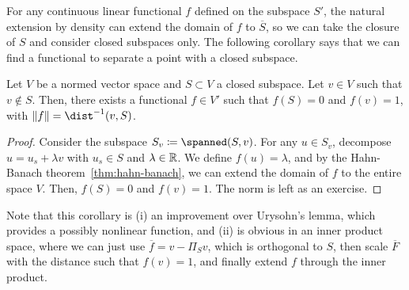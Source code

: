 For any continuous linear functional $f$ defined on the subspace $S'$, the natural extension by density can extend the domain of $f$ to $\overline{S}$, so we can take the closure of $S$ and consider closed subspaces only. The following corollary says that we can find a functional to separate a point with a closed subspace. 
\begin{corollary}\label{cor:hahn-banach-extension}
    Let $V$ be a normed vector space and $S\subset V$ a closed subspace. Let $v\in V$ such that $v\notin S$. Then, there exists a functional $f\in V'$ such that $f(S)=0$ and $f(v)=1$, with $\|f\| = \dist^{-1}(v, S)$.
    \begin{proof}
        Consider the subspace $S_v \coloneqq \spanned(S,v)$. For any $u\in S_v$, decompose $u=u_s+\lambda v$ with $u_s\in S$ and $\lambda\in \mathbb{R}$. We define $f(u)=\lambda$, and by the Hahn-Banach theorem~\ref{thm:hahn-banach}, we can extend the domain of $f$ to the entire space $V$. Then, $f(S)=0$ and $f(v)=1$. The norm is left as an exercise. 
    \end{proof}
\end{corollary}
Note that this corollary is (i) an improvement over Urysohn's lemma, which provides a possibly nonlinear function, and (ii) is obvious in an inner product space, where we can just use $\overline{f} = v - \Pi_S v$, which is orthogonal to $S$, then scale $\overline{F}$ with the distance such that $f(v)=1$, and finally extend $f$ through the inner product. 

